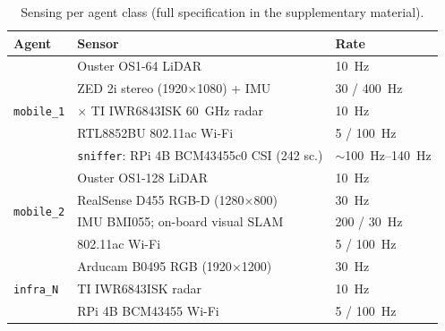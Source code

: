 \begin{table}[t]
\centering
\caption{Sensing per agent class (full specification in the
supplementary material).}
\label{tab:sensors}
\footnotesize
\setlength{\tabcolsep}{3pt}
\begin{tabularx}{\columnwidth}{@{}l>{\raggedright\arraybackslash}Xl@{}}
\toprule
Agent & Sensor & Rate \\
\midrule
\multirow{5}{*}{\texttt{mobile\_1}} & Ouster OS1-64 LiDAR & \SI{10}{\hertz} \\
 & ZED 2i stereo (1920$\times$1080) + IMU & 30 / \SI{400}{\hertz} \\
 & 2$\times$ TI IWR6843ISK \SI{60}{\giga\hertz} radar & \SI{10}{\hertz} \\
 & RTL8852BU 802.11ac Wi-Fi & 5 / \SI{100}{\hertz} \\
 & \texttt{sniffer}: RPi 4B BCM43455c0 CSI (242 sc.) & $\sim$\SIrange{100}{140}{\hertz} \\
\midrule
\multirow{4}{*}{\texttt{mobile\_2}} & Ouster OS1-128 LiDAR & \SI{10}{\hertz} \\
 & RealSense D455 RGB-D (1280$\times$800) & \SI{30}{\hertz} \\
 & IMU BMI055; on-board visual SLAM & 200 / \SI{30}{\hertz} \\
 & 802.11ac Wi-Fi & 5 / \SI{100}{\hertz} \\
\midrule
\multirow{3}{*}{\texttt{infra\_N}} & Arducam B0495 RGB (1920$\times$1200) & \SI{30}{\hertz} \\
 & TI IWR6843ISK radar & \SI{10}{\hertz} \\
 & RPi 4B BCM43455 Wi-Fi & 5 / \SI{100}{\hertz} \\
\bottomrule
\end{tabularx}
\end{table}
